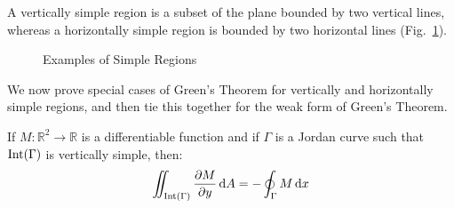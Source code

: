     A vertically simple region is a subset of the plane bounded by two
    vertical lines, whereas a horizontally simple region is
    bounded by two horizontal lines (Fig.~\ref{fig:Simply_Regions}).
    \begin{figure}[H]
        \centering
        \captionsetup{type=figure}
        \begin{subfigure}[b]{0.49\textwidth}
            \centering
            \captionsetup{type=figure}
            
        \end{subfigure}
        \hfill
        \begin{subfigure}[b]{0.49\textwidth}
            \centering
            \captionsetup{type=figure}
            
        \end{subfigure}
        \caption{Examples of Simple Regions}
        \label{fig:Simply_Regions}
    \end{figure}
    We now prove special cases of Green's Theorem for vertically and
    horizontally simple regions, and then tie this together for the weak
    form of Green's Theorem.
    \begin{theorem}
        \label{thm:Greens_Theorem_Simple_t1_region}%
        If $M:\mathbb{R}^{2}\rightarrow\mathbb{R}$ is
        a differentiable function and if $\Gamma$ is a Jordan curve such
        that $\operatorname{Int}(\Gamma)$ is vertically simple, then:
        \begin{equation}
            \iint_{\operatorname{Int}(\Gamma)}\frac{\partial{M}}{\partial{y}}\mathop{}\!\mathrm{d}{A}
            =-\oint_{\Gamma}M\mathop{}\!\mathrm{d}{x}
        \end{equation}
    \end{theorem}

